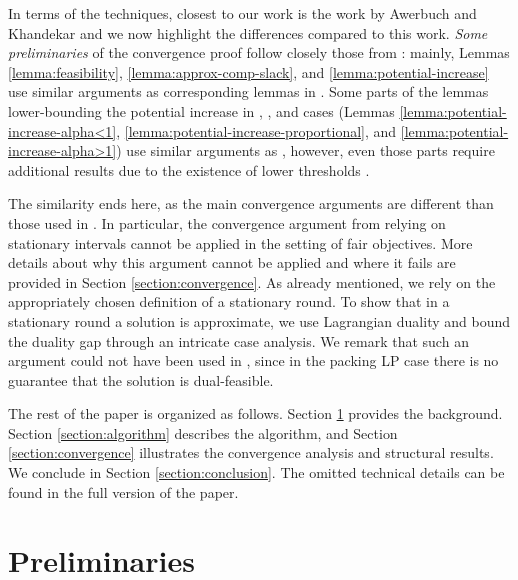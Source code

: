 \documentclass[11pt]{article}
\makeatletter
\renewcommand{\paragraph}{\@startsection{paragraph}{4}{\z@}{1ex \@plus 1ex \@minus .2ex}{-.5em}{\normalfont\normalsize\bfseries}}
\newif\iffullpaper
\makeatother
\begin{document}
{In terms of the techniques, closest to our work is the work by Awerbuch and Khandekar \cite{AwerbuchKhandekar2009} and we now highlight the differences compared to this work. \emph{Some preliminaries} of the convergence proof follow closely those from \cite{AwerbuchKhandekar2009}: mainly, Lemmas \ref{lemma:feasibility}, \ref{lemma:approx-comp-slack}, and \ref{lemma:potential-increase} use similar arguments as corresponding lemmas in \cite{AwerbuchKhandekar2009}. Some parts of the lemmas lower-bounding the potential increase in , , and  cases (Lemmas \ref{lemma:potential-increase-alpha<1}, \ref{lemma:potential-increase-proportional}, and \ref{lemma:potential-increase-alpha>1}) use similar arguments as \cite{AwerbuchKhandekar2009}, however, even those parts require additional results due to the existence of lower thresholds .}

{The similarity ends here, as the main convergence arguments are different than those used in \cite{AwerbuchKhandekar2009}. In particular, the convergence argument from \cite{AwerbuchKhandekar2009} relying on stationary intervals cannot be applied in the setting of fair objectives. More details about why this argument cannot be applied and where it fails are provided in Section \ref{section:convergence}. As already mentioned, we rely on the appropriately chosen definition of a stationary round. To show that in a stationary round a solution  is approximate, we use Lagrangian duality and bound the duality gap through an intricate case analysis. We remark that such an argument could not have been used in \cite{AwerbuchKhandekar2009}, since in the packing LP case there is no guarantee that the solution  is dual-feasible.
}

\paragraph{Organization of the Paper.} The rest of the paper is organized as follows. Section \ref{section:prelims} provides the background. Section \ref{section:algorithm} describes the algorithm, and Section \ref{section:convergence} \iffullpaper provides \else illustrates \fi the convergence analysis and structural results. \iffullpaper Section \ref{section:conclusion} concludes the paper. \else We conclude in Section \ref{section:conclusion}. {The omitted technical details can be found in the full version of the paper.}\fi

\section{Preliminaries}\label{section:prelims}
\end{document}

